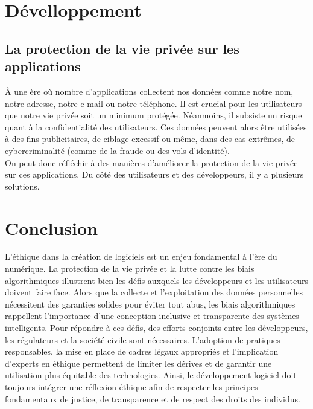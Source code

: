 \documentclass{article}
\begin{document}
\section{Dévelloppement}
\subsection{La protection de la vie privée sur les applications}
À une ère où nombre d'applications collectent nos données  comme notre nom, notre adresse, notre e-mail ou notre téléphone. Il est crucial pour les utilisateurs que notre vie privée soit un minimum protégée. Néanmoins, il subsiste un risque quant à la confidentialité des utilisateurs. Ces données peuvent alors être utilisées à des fins publicitaires, de ciblage excessif ou même, dans des cas extrêmes, de cybercriminalité (comme de la fraude ou des vols d'identité).\\
On peut donc réfléchir à des manières d'améliorer la protection de la vie privée sur ces applications. Du côté des utilisateurs et des développeurs, il y a plusieurs solutions.

\section{Conclusion}
L’éthique dans la création de logiciels est un enjeu fondamental à l’ère du numérique. La protection de la vie privée et la lutte contre les biais algorithmiques illustrent bien les défis auxquels les développeurs et les utilisateurs doivent faire face. Alors que la collecte et l’exploitation des données personnelles nécessitent des garanties solides pour éviter tout abus, les biais algorithmiques rappellent l’importance d’une conception inclusive et transparente des systèmes intelligents.
Pour répondre à ces défis, des efforts conjoints entre les développeurs, les régulateurs et la société civile sont nécessaires. L’adoption de pratiques responsables, la mise en place de cadres légaux appropriés et l’implication d’experts en éthique permettent de limiter les dérives et de garantir une utilisation plus équitable des technologies. Ainsi, le développement logiciel doit toujours intégrer une réflexion éthique afin de respecter les principes fondamentaux de justice, de transparence et de respect des droits des individus.
\end{document}

